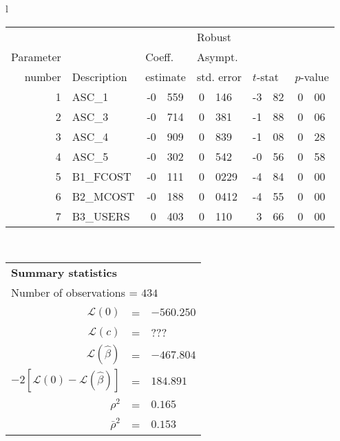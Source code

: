   \begin{tabular}{l}
\begin{tabular}{rlr@{.}lr@{.}lr@{.}lr@{.}l}
         &                       &   \multicolumn{2}{l}{}    & \multicolumn{2}{l}{Robust}  &     \multicolumn{4}{l}{}   \\
Parameter &                       &   \multicolumn{2}{l}{Coeff.}      & \multicolumn{2}{l}{Asympt.}  &     \multicolumn{4}{l}{}   \\
number &  Description                     &   \multicolumn{2}{l}{estimate}      & \multicolumn{2}{l}{std. error}  &   \multicolumn{2}{l}{$t$-stat}  &   \multicolumn{2}{l}{$p$-value}   \\

\hline

1 & ASC\_1 & -0&559 & 0&146 & -3&82 & 0&00 \\
2 & ASC\_3 & -0&714 & 0&381 & -1&88 & 0&06 \\
3 & ASC\_4 & -0&909 & 0&839 & -1&08 & 0&28 \\
4 & ASC\_5 & -0&302 & 0&542 & -0&56 & 0&58 \\
5 & B1\_FCOST & -0&111 & 0&0229 & -4&84 & 0&00 \\
6 & B2\_MCOST & -0&188 & 0&0412 & -4&55 & 0&00 \\
7 & B3\_USERS & 0&403 & 0&110 & 3&66 & 0&00 \\
\hline

\end{tabular}
\\
\begin{tabular}{rcl}
\multicolumn{3}{l}{\bf Summary statistics}\\
\multicolumn{3}{l}{ Number of observations = $434$} \\
 $\mathcal{L}(0)$ &=&  $-560.250$ \\
 $\mathcal{L}(c)$ &=& ???\\
 $\mathcal{L}(\hat{\beta})$ &=& $-467.804 $  \\
 $-2[\mathcal{L}(0) -\mathcal{L}(\hat{\beta})]$ &=& $184.891$ \\
    $\rho^2$ &=&   $0.165$ \\
    $\bar{\rho}^2$ &=&    $0.153$ \\
\end{tabular}
\end{tabular}

